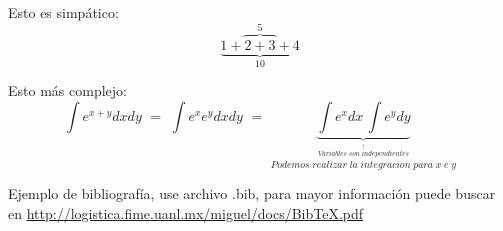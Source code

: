 \documentclass[13 pts]{article}
\theoremstyle{definition}
\begin{document}
Esto es simpático:
\[ \underbrace{1 + \overbrace{2 + 3}^{5} + 4}_{10} \]

Esto más complejo:
\begin{displaymath}
  \int e^{x+y}dx dy \,\, = \,\,
  \int e^x e^y dxdy \,\, = \,\,
  \underbrace{\int e^x dx \, \int e^y dy}_{\stackrel{\stackrel{\uparrow}{Variables \; son \;independientes}}{Podemos \;realizar\; la\; integracion\; para\; x\; e\; y}}
\end{displaymath}



Ejemplo de bibliografía, use archivo .bib, para mayor información puede buscar en \url{http://logistica.fime.uanl.mx/miguel/docs/BibTeX.pdf}

\nocite{huertas2001calculo,franco2015calculo,giraldoactuaria}
{}
    
\end{document}
